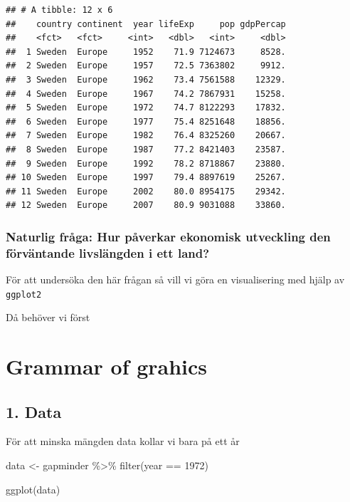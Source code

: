\documentclass[
]{book}
\newenvironment{Shaded}{\begin{snugshade}}{\end{snugshade}}
\newcommand{\DecValTok}[1]{\textcolor[rgb]{0.00,0.00,0.81}{#1}}
\newcommand{\FunctionTok}[1]{\textcolor[rgb]{0.00,0.00,0.00}{#1}}
\newcommand{\NormalTok}[1]{#1}
\newcommand{\OtherTok}[1]{\textcolor[rgb]{0.56,0.35,0.01}{#1}}
\newcommand{\SpecialCharTok}[1]{\textcolor[rgb]{0.00,0.00,0.00}{#1}}
\begin{document}
\begin{verbatim}
## # A tibble: 12 x 6
##    country continent  year lifeExp     pop gdpPercap
##    <fct>   <fct>     <int>   <dbl>   <int>     <dbl>
##  1 Sweden  Europe     1952    71.9 7124673     8528.
##  2 Sweden  Europe     1957    72.5 7363802     9912.
##  3 Sweden  Europe     1962    73.4 7561588    12329.
##  4 Sweden  Europe     1967    74.2 7867931    15258.
##  5 Sweden  Europe     1972    74.7 8122293    17832.
##  6 Sweden  Europe     1977    75.4 8251648    18856.
##  7 Sweden  Europe     1982    76.4 8325260    20667.
##  8 Sweden  Europe     1987    77.2 8421403    23587.
##  9 Sweden  Europe     1992    78.2 8718867    23880.
## 10 Sweden  Europe     1997    79.4 8897619    25267.
## 11 Sweden  Europe     2002    80.0 8954175    29342.
## 12 Sweden  Europe     2007    80.9 9031088    33860.
\end{verbatim}

\hypertarget{naturlig-fruxe5ga-hur-puxe5verkar-ekonomisk-utveckling-den-fuxf6rvuxe4ntande-livsluxe4ngden-i-ett-land}{%
\subsubsection{Naturlig fråga: Hur påverkar ekonomisk utveckling den förväntande livslängden i ett land?}\label{naturlig-fruxe5ga-hur-puxe5verkar-ekonomisk-utveckling-den-fuxf6rvuxe4ntande-livsluxe4ngden-i-ett-land}}

För att undersöka den här frågan så vill vi göra en visualisering med hjälp av \texttt{ggplot2}

Då behöver vi först

\hypertarget{grammar-of-grahics}{%
\section{Grammar of grahics}\label{grammar-of-grahics}}

\hypertarget{data}{%
\subsection{1. Data}\label{data}}

För att minska mängden data kollar vi bara på ett år

\begin{Shaded}
\begin{Highlighting}[]
\NormalTok{data }\OtherTok{\textless{}{-}}\NormalTok{ gapminder }\SpecialCharTok{\%\textgreater{}\%}
  \FunctionTok{filter}\NormalTok{(year }\SpecialCharTok{==} \DecValTok{1972}\NormalTok{)}

\FunctionTok{ggplot}\NormalTok{(data)}
\end{Highlighting}
\end{Shaded}
\end{document}
